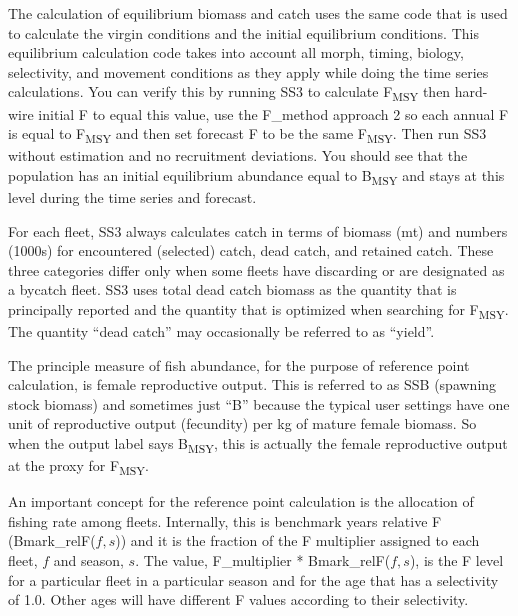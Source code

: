 The calculation of equilibrium biomass and catch uses the same code that is used to calculate the virgin conditions and the initial equilibrium conditions. This equilibrium calculation code takes into account all morph, timing, biology, selectivity, and movement conditions as they apply while doing the time series calculations. You can verify this by running SS3 to calculate F\textsubscript{MSY} then hard-wire initial F to equal this value, use the F\_method approach 2 so each annual F is equal to F\textsubscript{MSY} and then set forecast F to be the same F\textsubscript{MSY}. Then run SS3 without estimation and no recruitment deviations. You should see that the population has an initial equilibrium abundance equal to B\textsubscript{MSY} and stays at this level during the time series and forecast.

For each fleet, SS3 always calculates catch in terms of biomass (mt) and numbers (1000s) for encountered (selected) catch, dead catch, and retained catch. These three categories differ only when some fleets have discarding or are designated as a bycatch fleet. SS3 uses total dead catch biomass as the quantity that is principally reported and the quantity that is optimized when searching for F\textsubscript{MSY}. The quantity ``dead catch'' may occasionally be referred to as ``yield''.

The principle measure of fish abundance, for the purpose of reference point calculation, is female reproductive output. This is referred to as SSB (spawning stock biomass) and sometimes just ``B'' because the typical user settings have one unit of reproductive output (fecundity) per kg of mature female biomass. So when the output label says B\textsubscript{MSY}, this is actually the female reproductive output at the proxy for F\textsubscript{MSY}.

An important concept for the reference point calculation is the allocation of fishing rate among fleets. Internally, this is benchmark years relative F (Bmark\_relF($f,s$)) and it is the fraction of the F multiplier assigned to each fleet, $f$ and season, $s$. The value, F\_multiplier * Bmark\_relF($f,s$), is the F level for a particular fleet in a particular season and for the age that has a selectivity of 1.0. Other ages will have different F values according to their selectivity.

